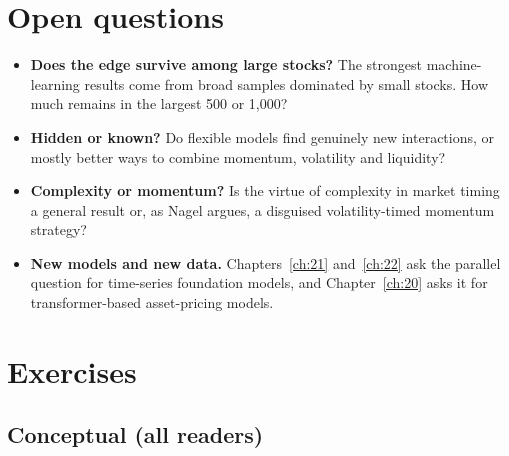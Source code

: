 \section{Open questions}
\label{sec:19-open}

\begin{itemize}
  \item \textbf{Does the edge survive among large stocks?} The strongest machine-learning results come from broad samples dominated by small stocks. How much remains in the largest 500 or 1,000?
  \item \textbf{Hidden or known?} Do flexible models find genuinely new interactions, or mostly better ways to combine momentum, volatility and liquidity?
  \item \textbf{Complexity or momentum?} Is the virtue of complexity in market timing a general result or, as Nagel argues, a disguised volatility-timed momentum strategy?
  \item \textbf{New models and new data.} Chapters~\ref{ch:21} and~\ref{ch:22} ask the parallel question for time-series foundation models, and Chapter~\ref{ch:20} asks it for transformer-based asset-pricing models.
\end{itemize}

\section*{Exercises}

\subsection*{Conceptual (all readers)}

